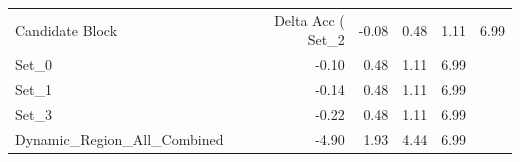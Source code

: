 \begin{tabular}{lrrrr}
\toprule
Candidate Block & Delta Acc (%
\midrule
Set_2 & -0.08 & 0.48 & 1.11 & 6.99 \\
Set_0 & -0.10 & 0.48 & 1.11 & 6.99 \\
Set_1 & -0.14 & 0.48 & 1.11 & 6.99 \\
Set_3 & -0.22 & 0.48 & 1.11 & 6.99 \\
Dynamic_Region_All_Combined & -4.90 & 1.93 & 4.44 & 6.99 \\
\bottomrule
\end{tabular}
